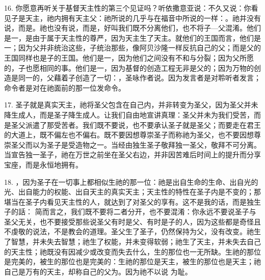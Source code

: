 16. 你愿意再听关于基督天主性的第三个见证吗？听依撒意亚说：不久又说：你看见子是天主，祂内拥有天主父：祂所说的几乎与在福音中所说的一样：。祂并没有说，而是。祂也没有说，而是，好叫我们既不分离他们，也不将子—父混淆。他们是一，是由于属于天主性的尊严，因为天主生了天主。就他们的王国而言，他们是一；因为父并非统治这些，子统治那些，像阿贝沙隆一样反抗自己的父；而是父的王国同样也是子的王国。他们是一，因为他们之间没有不和与分裂；因为父所愿的，子也愿相同的事。他们是一，因为基督的创造工程无非是父的；因为万物的创造是同一的，父藉着子创造了一切：，圣咏作者说。因为发言者是对聆听者发言；命令者是对在祂面前的那一位发命令。\par

17. 圣子就是真实天主，祂将圣父包含在自己内，并非转变为圣父，因为圣父并未降生成人，而是圣子降生成人。让我们自由地宣讲真理：圣父并未为我们受苦，而是圣父派遣了那受苦者。我们既不要说，也不要承认圣子就是圣父；而要走在君王的大道上，既不偏左也不偏右。既不要因想尊崇圣子而称祂为圣父，也不要因想尊崇圣父而以为圣子是受造物之一。当经由独生圣子敬拜独一圣父，敬拜不可分离。当宣告独一圣子，祂在万世之前坐在圣父右边，并非因苦难后时间上的提升而分享宝座，而是永恒地拥有。\par

18.  ，因为圣子在一切事上都相似生祂的那一位：祂是出自生命的生命、出自光的光、出自能力的权能、出自天主的真实天主；天主性的特性在圣子内是不变的；那堪当在圣子内看见天主性的人，就达到了对圣父的享有。这不是我的话，而是独生子的話：  简而言之，我们既不要将二者分开，也不要混淆：你永远不要说圣子与圣父无关，也不要接受那些说圣父有时是父、有时是子的人，因为这些都是奇怪且不虔敬的说法，不是教会的道理。圣父生了圣子，仍然保持为父，没有改变。祂生了智慧，并未失去智慧；祂生了权能，并未变得软弱；祂生了天主，并未失去自己的天主性；祂既没有因减少或改变而失去什么，生的那位也一无所缺。生祂的那位是完美的，被生的那位也是完美的：生祂的那位是天主，被生的那位也是天主；祂自己是万有的天主，却称自己的父为。因为祂不以说  为耻。\par

